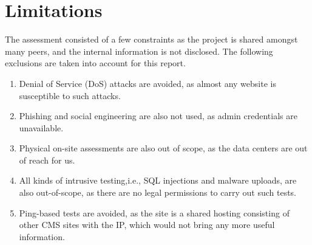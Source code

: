 \chapter{Limitations}
The assessment consisted of a few constraints as the project is shared amongst many peers, and the internal information is not disclosed. The following exclusions are taken into account for this report.
\begin{enumerate}
    \item Denial of Service (DoS) attacks are avoided, as almost any website is susceptible to such attacks.
    \item Phishing and social engineering are also not used, as admin credentials are unavailable.
    \item Physical on-site assessments are also out of scope, as the data centers are out of reach for us.
    \item All kinds of intrusive testing,i.e., SQL injections and malware uploads, are also out-of-scope, as there are no legal permissions to carry out such tests.
    \item Ping-based tests are avoided, as the site is a shared hosting consisting of other CMS sites with the IP, which would not bring any more useful information.
\end{enumerate}
